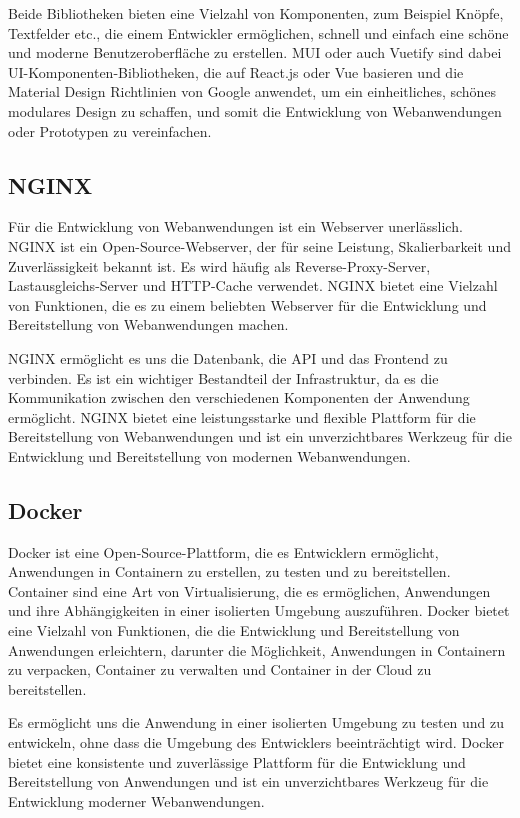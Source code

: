 Beide Bibliotheken bieten eine Vielzahl von Komponenten, zum Beispiel Knöpfe, Textfelder etc., die einem Entwickler ermöglichen, schnell und einfach eine schöne und moderne Benutzeroberfläche zu erstellen. \acf{MUI} oder auch Vuetify sind dabei \acs{UI}-Komponenten-Bibliotheken, die auf React.js oder Vue basieren und die Material Design Richtlinien von Google anwendet, um ein einheitliches, schönes modulares Design zu schaffen, und somit die Entwicklung von Webanwendungen oder Prototypen zu vereinfachen.\cite{materialui, vuetify}

\subsection{NGINX}

Für die Entwicklung von Webanwendungen ist ein Webserver unerlässlich. \acf{NGINX} ist ein Open-Source-Webserver, der für seine Leistung, Skalierbarkeit und Zuverlässigkeit bekannt ist. Es wird häufig als Reverse-Proxy-Server, Lastausgleichs-Server und HTTP-Cache verwendet. \acs{NGINX} bietet eine Vielzahl von Funktionen, die es zu einem beliebten Webserver für die Entwicklung und Bereitstellung von Webanwendungen machen.

NGINX ermöglicht es uns die Datenbank, die \acs{API} und das Frontend zu verbinden. Es ist ein wichtiger Bestandteil der Infrastruktur, da es die Kommunikation zwischen den verschiedenen Komponenten der Anwendung ermöglicht. \acs{NGINX} bietet eine leistungsstarke und flexible Plattform für die Bereitstellung von Webanwendungen und ist ein unverzichtbares Werkzeug für die Entwicklung und Bereitstellung von modernen Webanwendungen. \cite{nginx}

\subsection{Docker}

Docker ist eine Open-Source-Plattform, die es Entwicklern ermöglicht, Anwendungen in Containern zu erstellen, zu testen und zu bereitstellen. Container sind eine Art von Virtualisierung, die es ermöglichen, Anwendungen und ihre Abhängigkeiten in einer isolierten Umgebung auszuführen. Docker bietet eine Vielzahl von Funktionen, die die Entwicklung und Bereitstellung von Anwendungen erleichtern, darunter die Möglichkeit, Anwendungen in Containern zu verpacken, Container zu verwalten und Container in der Cloud zu bereitstellen.

Es ermöglicht uns die Anwendung in einer isolierten Umgebung zu testen und zu entwickeln, ohne dass die Umgebung des Entwicklers beeinträchtigt wird. Docker bietet eine konsistente und zuverlässige Plattform für die Entwicklung und Bereitstellung von Anwendungen und ist ein unverzichtbares Werkzeug für die Entwicklung moderner Webanwendungen. \cite{docker}

